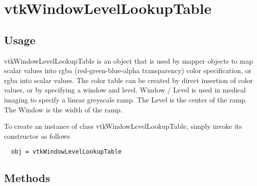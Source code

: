 \section{vtkWindowLevelLookupTable}

\subsection{Usage}

 vtkWindowLevelLookupTable is an object that is used by mapper objects
 to map scalar values into rgba (red-green-blue-alpha transparency)
 color specification, or rgba into scalar values. The color table can
 be created by direct insertion of color values, or by specifying a
 window and level. Window / Level is used in medical imaging to specify
 a linear greyscale ramp. The Level is the center of the ramp.  The
 Window is the width of the ramp.

To create an instance of class vtkWindowLevelLookupTable, simply
invoke its constructor as follows
\begin{verbatim}
  obj = vtkWindowLevelLookupTable
\end{verbatim}
\subsection{Methods}

